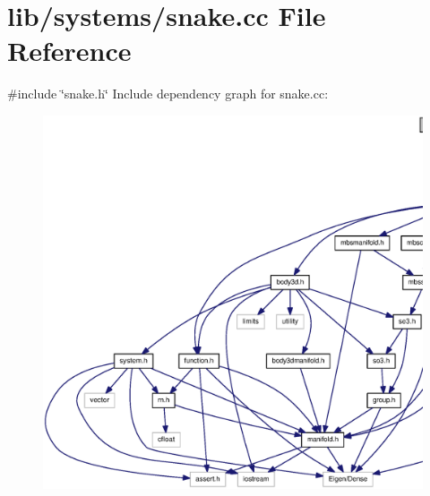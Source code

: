 \section{lib/systems/snake.cc \-File \-Reference}
\label{snake_8cc}
{\ttfamily \#include \char`\"{}snake.\-h\char`\"{}}\*
\-Include dependency graph for snake.\-cc\-:\nopagebreak
\begin{figure}[H]
\begin{center}
\leavevmode
\includegraphics[width=350pt]{snake_8cc__incl}
\end{center}
\end{figure}
